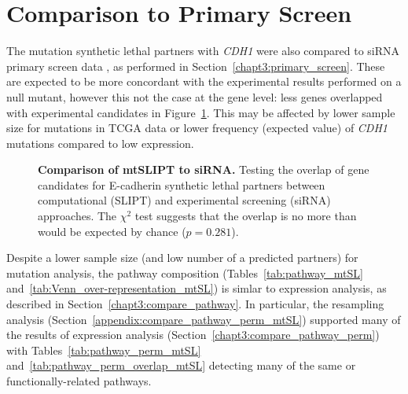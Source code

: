 \clearpage
\section{Comparison to Primary Screen}

The mutation synthetic lethal partners with \textit{CDH1} were also compared to siRNA primary screen data \citep{Telford2015}, as performed in Section~\ref{chapt3:primary_screen}. These are expected to be more concordant with the experimental results performed on a null mutant, however this not the case at the gene level: less genes overlapped with experimental candidates in Figure~\ref{fig:Venn_allgenes_mtSL}. This may be affected by lower sample size for mutations in TCGA data or lower frequency (expected value) of \textit{CDH1} mutations compared to low expression. 

\begin{figure}[!ht]
  \centering
    \caption[Comparison of mtSLIPT to siRNA]{\small \textbf{Comparison of mtSLIPT to siRNA.} Testing the overlap of gene candidates for E-cadherin synthetic lethal partners between computational (SLIPT) and experimental screening (siRNA) approaches. The $\chi^2$ test suggests that the overlap is no more than would be expected by chance ($p = 0.281$). %
}
\label{fig:Venn_allgenes_mtSL}
\end{figure}

\FloatBarrier

Despite a lower sample size (and low number of a predicted partners) for mutation analysis, the pathway composition (Tables~\ref{tab:pathway_mtSL} and~\ref{tab:Venn_over-representation_mtSL}) is simlar to expression analysis, as described in Section~\ref{chapt3:compare_pathway}. In particular, the resampling analysis (Section~\ref{appendix:compare_pathway_perm_mtSL}) supported many of the results of expression analysis (Section~\ref{chapt3:compare_pathway_perm}) with Tables~\ref{tab:pathway_perm_mtSL} and~\ref{tab:pathway_perm_overlap_mtSL} detecting many of the same or functionally-related pathways.
 

